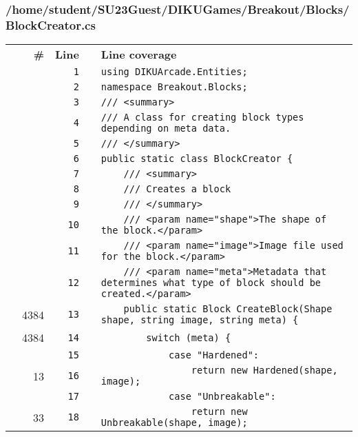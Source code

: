 \documentclass[a4paper,landscape,10pt]{article}
\begin{document}
\subsubsection{/home/student/SU23Guest/DIKUGames/Breakout/Blocks/BlockCreator.cs}
\begin{longtable}[l]{lrrll}
\textbf{} & \textbf{\#} & \textbf{Line} & \textbf{} & \textbf{Line coverage}\\
\cellcolor{gray} &  & \verb~1~ & & \verb~using DIKUArcade.Entities;~\\
\cellcolor{gray} &  & \verb~2~ & & \verb~namespace Breakout.Blocks;~\\
\cellcolor{gray} &  & \verb~3~ & & \verb~/// <summary>~\\
\cellcolor{gray} &  & \verb~4~ & & \verb~/// A class for creating block types depending on meta data.~\\
\cellcolor{gray} &  & \verb~5~ & & \verb~/// </summary>~\\
\cellcolor{gray} &  & \verb~6~ & & \verb~public static class BlockCreator {~\\
\cellcolor{gray} &  & \verb~7~ & & \verb~    /// <summary>~\\
\cellcolor{gray} &  & \verb~8~ & & \verb~    /// Creates a block~\\
\cellcolor{gray} &  & \verb~9~ & & \verb~    /// </summary>~\\
\cellcolor{gray} &  & \verb~10~ & & \verb~    /// <param name="shape">The shape of the block.</param>~\\
\cellcolor{gray} &  & \verb~11~ & & \verb~    /// <param name="image">Image file used for the block.</param>~\\
\cellcolor{gray} &  & \verb~12~ & & \verb~    /// <param name="meta">Metadata that determines what type of block should be created.</param>~\\
\cellcolor{green} & 4384 & \verb~13~ & & \verb~    public static Block CreateBlock(Shape shape, string image, string meta) {~\\
\cellcolor{green} & 4384 & \verb~14~ & & \verb~        switch (meta) {~\\
\cellcolor{gray} &  & \verb~15~ & & \verb~            case "Hardened":~\\
\cellcolor{green} & 13 & \verb~16~ & & \verb~                return new Hardened(shape, image);~\\
\cellcolor{gray} &  & \verb~17~ & & \verb~            case "Unbreakable":~\\
\cellcolor{green} & 33 & \verb~18~ & & \verb~                return new Unbreakable(shape, image);~\\

\end{longtable}
\end{document}
